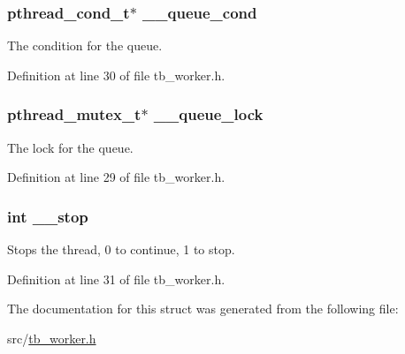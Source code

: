 \hypertarget{structtb__worker__t_a1302209e4d7c2a7707bfcd735ead74e0}{
\subsubsection[{\-\_\-\-\_\-queue\-\_\-cond}]{\setlength{\rightskip}{0pt plus 5cm}pthread\-\_\-cond\-\_\-t$\ast$ \-\_\-\-\_\-queue\-\_\-cond}}\label{structtb__worker__t_a1302209e4d7c2a7707bfcd735ead74e0}


The condition for the queue. 



Definition at line 30 of file tb\-\_\-worker.\-h.

\hypertarget{structtb__worker__t_a0721617bd4bf8c42313acd1791f62885}{
\subsubsection[{\-\_\-\-\_\-queue\-\_\-lock}]{\setlength{\rightskip}{0pt plus 5cm}pthread\-\_\-mutex\-\_\-t$\ast$ \-\_\-\-\_\-queue\-\_\-lock}}\label{structtb__worker__t_a0721617bd4bf8c42313acd1791f62885}


The lock for the queue. 



Definition at line 29 of file tb\-\_\-worker.\-h.

\hypertarget{structtb__worker__t_a3c8ddb573339a9677d54ba3e63387f1d}{
\subsubsection[{\-\_\-\-\_\-stop}]{\setlength{\rightskip}{0pt plus 5cm}int \-\_\-\-\_\-stop}}\label{structtb__worker__t_a3c8ddb573339a9677d54ba3e63387f1d}


Stops the thread, 0 to continue, 1 to stop. 



Definition at line 31 of file tb\-\_\-worker.\-h.



The documentation for this struct was generated from the following file\-:\begin{DoxyCompactItemize}
\item 
src/\hyperlink{tb__worker_8h}{tb\-\_\-worker.\-h}\end{DoxyCompactItemize}
